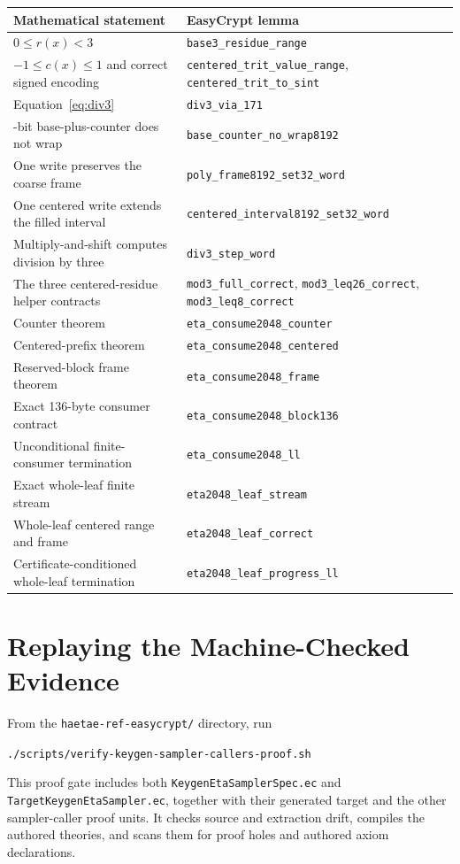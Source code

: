 \documentclass[11pt]{article}
\theoremstyle{definition}
\theoremstyle{plain}
\theoremstyle{remark}
\newcommand{\code}[1]{\nolinkurl{#1}}
\begin{document}
\begin{center}
\footnotesize
\begin{tabularx}{0.98\textwidth}{>{\raggedright\arraybackslash}p{}>{\raggedright\arraybackslash}X}
\toprule
Mathematical statement & EasyCrypt lemma \\
\midrule
$0\le r(x)<3$ & \code{base3_residue_range} \\
$-1\le c(x)\le1$ and correct signed encoding &
\code{centered_trit_value_range}, \code{centered_trit_to_sint} \\
Equation~\eqref{eq:div3} & \code{div3_via_171} \\
64-bit base-plus-counter does not wrap & \code{base_counter_no_wrap8192} \\
One write preserves the coarse frame & \code{poly_frame8192_set32_word} \\
One centered write extends the filled interval &
\code{centered_interval8192_set32_word} \\
Multiply-and-shift computes division by three & \code{div3_step_word} \\
The three centered-residue helper contracts &
\code{mod3_full_correct}, \code{mod3_leq26_correct},
\code{mod3_leq8_correct} \\
Counter theorem & \code{eta_consume2048_counter} \\
Centered-prefix theorem & \code{eta_consume2048_centered} \\
Reserved-block frame theorem & \code{eta_consume2048_frame} \\
Exact 136-byte consumer contract & \code{eta_consume2048_block136} \\
Unconditional finite-consumer termination & \code{eta_consume2048_ll} \\
Exact whole-leaf finite stream & \code{eta2048_leaf_stream} \\
Whole-leaf centered range and frame & \code{eta2048_leaf_correct} \\
Certificate-conditioned whole-leaf termination & \code{eta2048_leaf_progress_ll} \\
\bottomrule
\end{tabularx}
\end{center}

\section{Replaying the Machine-Checked Evidence}

From the \code{haetae-ref-easycrypt/} directory, run
\begin{center}
\code{./scripts/verify-keygen-sampler-callers-proof.sh}
\end{center}
This proof gate includes both \code{KeygenEtaSamplerSpec.ec} and
\code{TargetKeygenEtaSampler.ec}, together with their generated target and
the other sampler-caller proof units.  It checks source and extraction drift,
compiles the authored theories, and scans them for proof holes and authored
axiom declarations.
\end{document}
